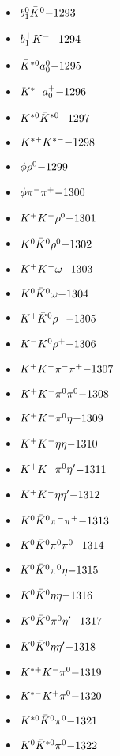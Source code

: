 \begin{multicols}{3}
\begin{itemize}
 \item $ b_{1}^{0} \bar{K}^{0} \hfill{-1293}$
 \item $ b_{1}^{+} K^{-} \hfill{-1294}$
 \item $ \bar{K}^{*0} a_{0}^{0} \hfill{-1295}$
 \item $ K^{*-} a_{0}^{+} \hfill{-1296}$
 \item $ K^{*0} \bar{K}^{*0} \hfill{-1297}$
 \item $ K^{*+} K^{*-} \hfill{-1298}$
 \item $ \phi \rho^{0} \hfill{-1299}$
 \item $ \phi \pi^{-} \pi^{+} \hfill{-1300}$
 \item $ K^{+} K^{-} \rho^{0} \hfill{-1301}$
 \item $ K^{0} \bar{K}^{0} \rho^{0} \hfill{-1302}$
 \item $ K^{+} K^{-} \omega \hfill{-1303}$
 \item $ K^{0} \bar{K}^{0} \omega \hfill{-1304}$
 \item $ K^{+} \bar{K}^{0} \rho^{-} \hfill{-1305}$
 \item $ K^{-} K^{0} \rho^{+} \hfill{-1306}$
 \item $ K^{+} K^{-} \pi^{-} \pi^{+} \hfill{-1307}$
 \item $ K^{+} K^{-} \pi^{0} \pi^{0} \hfill{-1308}$
 \item $ K^{+} K^{-} \pi^{0} \eta \hfill{-1309}$
 \item $ K^{+} K^{-} \eta \eta \hfill{-1310}$
 \item $ K^{+} K^{-} \pi^{0} {\eta^{\prime}} \hfill{-1311}$
 \item $ K^{+} K^{-} \eta {\eta^{\prime}} \hfill{-1312}$
 \item $ K^{0} \bar{K}^{0} \pi^{-} \pi^{+} \hfill{-1313}$
 \item $ K^{0} \bar{K}^{0} \pi^{0} \pi^{0} \hfill{-1314}$
 \item $ K^{0} \bar{K}^{0} \pi^{0} \eta \hfill{-1315}$
 \item $ K^{0} \bar{K}^{0} \eta \eta \hfill{-1316}$
 \item $ K^{0} \bar{K}^{0} \pi^{0} {\eta^{\prime}} \hfill{-1317}$
 \item $ K^{0} \bar{K}^{0} \eta {\eta^{\prime}} \hfill{-1318}$
 \item $ K^{*+} K^{-} \pi^{0} \hfill{-1319}$
 \item $ K^{*-} K^{+} \pi^{0} \hfill{-1320}$
 \item $ K^{*0} \bar{K}^{0} \pi^{0} \hfill{-1321}$
 \item $ K^{0} \bar{K}^{*0} \pi^{0} \hfill{-1322}$

\end{itemize}
\end{multicols}
